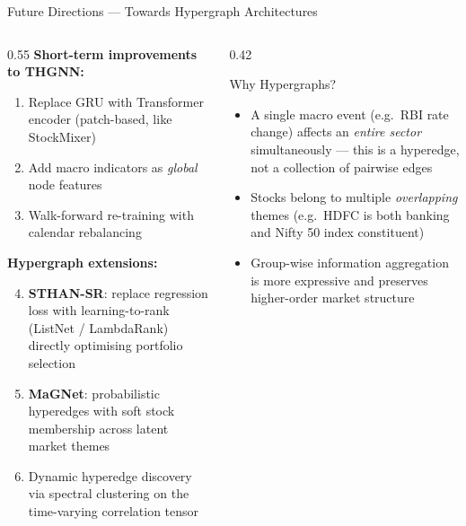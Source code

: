 \documentclass[aspectratio=169, 10pt]{beamer}
\begin{document}
\begin{frame}{Future Directions — Towards Hypergraph Architectures}
  \begin{columns}[T]
    \begin{column}{0.55\textwidth}
      \textbf{Short-term improvements to THGNN:}
      \begin{enumerate}
        \item Replace GRU with Transformer encoder (patch-based, like StockMixer)
        \item Add macro indicators as \emph{global} node features
        \item Walk-forward re-training with calendar rebalancing
      \end{enumerate}

      \bigskip
      \textbf{Hypergraph extensions:}
      \begin{enumerate}
        \setcounter{enumi}{3}
        \item \textbf{STHAN-SR}: replace regression loss with
              learning-to-rank (ListNet / LambdaRank) directly optimising
              portfolio selection
        \item \textbf{MaGNet}: probabilistic hyperedges with soft stock
              membership across latent market themes
        \item Dynamic hyperedge discovery via spectral clustering on the
              time-varying correlation tensor
      \end{enumerate}
    \end{column}
    \begin{column}{0.42\textwidth}
      \begin{block}{Why Hypergraphs?}
        \begin{itemize}
          \item A single macro event (e.g.\ RBI rate change) affects an
                \emph{entire sector} simultaneously — this is a hyperedge,
                not a collection of pairwise edges
          \item Stocks belong to multiple \emph{overlapping} themes
                (e.g.\ HDFC is both banking and Nifty 50 index constituent)
          \item Group-wise information aggregation is more expressive and
                preserves higher-order market structure
        \end{itemize}
      \end{block}
    \end{column}
  \end{columns}
\end{frame}
\end{document}
